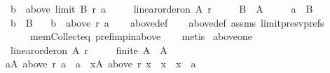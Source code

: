 \begin{isabellebody}
\ \ \ \ {\isachardoublequoteopen}b\ {\isasymin}\ above\ {\isacharparenleft}{\kern0pt}limit\ B\ r{\isacharparenright}{\kern0pt}\ a{\isachardoublequoteclose}\ \isanewline
\ \ \ \ {\isachardoublequoteopen}linear{\isacharunderscore}{\kern0pt}order{\isacharunderscore}{\kern0pt}on\ A\ r{\isachardoublequoteclose}\ \isanewline
\ \ \ \ {\isachardoublequoteopen}B\ {\isasymsubseteq}\ A{\isachardoublequoteclose}\ \isanewline
\ \ \ \ {\isachardoublequoteopen}a\ {\isasymin}\ B{\isachardoublequoteclose}\ \isanewline
\ \ \ \ {\isachardoublequoteopen}b\ {\isasymin}\ B{\isachardoublequoteclose}\isanewline
\ \ \ {\isachardoublequoteopen}b\ {\isasymin}\ above\ r\ a{\isachardoublequoteclose}\isanewline
%
\isadelimproof
\ \ %
\endisadelimproof
%
\isatagproof
{}\isamarkupfalse%
\ above{\isacharunderscore}{\kern0pt}def\isanewline
\ \ \isamarkupfalse%
\ above{\isacharunderscore}{\kern0pt}def\ assms{\isacharparenleft}{\kern0pt}{}{\isacharparenright}{\kern0pt}\ limit{\isacharunderscore}{\kern0pt}presv{\isacharunderscore}{\kern0pt}prefs{}\isanewline
\ \ \ \ \ \ \ \ mem{\isacharunderscore}{\kern0pt}Collect{\isacharunderscore}{\kern0pt}eq\ pref{\isacharunderscore}{\kern0pt}imp{\isacharunderscore}{\kern0pt}in{\isacharunderscore}{\kern0pt}above\isanewline
\ \ \isamarkupfalse%
\ metis%
\endisatagproof
{\isafoldproof}%
%
\isadelimproof
\isanewline
%
\endisadelimproof
\isanewline
{}\isamarkupfalse%
\ above{\isacharunderscore}{\kern0pt}one{\isacharcolon}{\kern0pt}\isanewline
\ \ \isanewline
\ \ \ \ {\isachardoublequoteopen}linear{\isacharunderscore}{\kern0pt}order{\isacharunderscore}{\kern0pt}on\ A\ r{\isachardoublequoteclose}\ \isanewline
\ \ \ \ {\isachardoublequoteopen}finite\ A\ {\isasymand}\ A\ {\isasymnoteq}\ {\isacharbraceleft}{\kern0pt}{\isacharbraceright}{\kern0pt}{\isachardoublequoteclose}\isanewline
\ \ \ {\isachardoublequoteopen}{\isasymexists}a{\isasymin}A{\isachardot}{\kern0pt}\ above\ r\ a\ {\isacharequal}{\kern0pt}\ {\isacharbraceleft}{\kern0pt}a{\isacharbraceright}{\kern0pt}\ {\isasymand}\ {\isacharparenleft}{\kern0pt}{\isasymforall}x{\isasymin}A{\isachardot}{\kern0pt}\ above\ r\ x\ {\isacharequal}{\kern0pt}\ {\isacharbraceleft}{\kern0pt}x{\isacharbraceright}{\kern0pt}\ {\isasymlongrightarrow}\ x\ {\isacharequal}{\kern0pt}\ a{\isacharparenright}{\kern0pt}{\isachardoublequoteclose}\isanewline
%
\isadelimproof
%
\endisadelimproof
%
\isatagproof
{}\isamarkupfalse%

\end{isabellebody}
